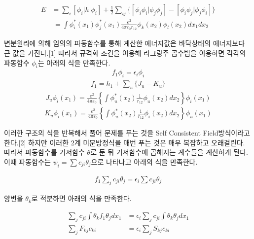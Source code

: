 \documentclass[%
 reprint,
 amsmath,amssymb,
 aps,
]{revtex4-2}
\begin{document}
\begin{align}
	E &= \sum_{i} [\phi_{i}|h|\phi_{i}]+\frac{1}{2}\sum_{ij}\{[\phi_{i}\phi_{i}|\phi_{j}\phi_{j}]-[\phi_{i}\phi_{j}|\phi_{j}\phi_{i}]\}
\end{align}
\begin{align}
	[\phi_{i}\phi_{j}|\phi_{k}\phi_{l}] &= \int \phi_{i}^{*}(x_{1})\phi_{j}^{*}(x_{1})\frac{e^{2}}{4\pi\varepsilon_{0}r_{12}}\phi_{k}(x_{2})\phi_{l}(x_{2})dx_{1}dx_{2}
\end{align}

변분원리에 의해 임의의 파동함수를 통해 계산한 에너지값은 바닥상태의 에너지보다 큰 값을 가진다.[1] 따라서 규격화 조건을 이용해 라그랑주 곱수법을 이용하면 각각의 파동함수 $\phi_{i}$는 아래의 식을 만족한다.
\begin{align}
	f_{1}\phi_{i} = \epsilon_{i}\phi_{i}
\end{align}
\begin{align}
	f_{1} = h_{1} + \sum_{u}\{J_{u}-K_{u}\}
\end{align}
\begin{align}
	J_{u}\phi_{i}(x_{1}) = \frac{e^{2}}{4\pi\varepsilon_{0}}\left\{ \int \phi_{u}^{*}(x_{2})\frac{1}{r_{12}}\phi_{u}(x_{2})dx_{2} \right\}\phi_{i}(x_{1})
\end{align}
\begin{align}
	K_{u}\phi_{i}(x_{1}) = \frac{e^{2}}{4\pi\varepsilon_{0}}\left\{ \int \phi_{u}^{*}(x_{2})\frac{1}{r_{12}}\phi_{i}(x_{2})dx_{2} \right\}\phi_{u}(x_{1})
\end{align}

이러한 구조의 식을 반복해서 풀어 문제를 푸는 것을 Self Consistent Field방식이라고 한다.[2] 하지만 이러한 2계 미분방정식을 매번 푸는 것은 매우 복잡하고 오래걸린다. 따라서 파동함수를 기저함수 $\theta$로 둔 뒤 기저함수에 곱해지는 계수들을 계산하게 된다. 이때 파동함수는 $\psi_{i} = \sum c_{ji}\theta_{j}$으로 나타나고 아래의 식을 만족한다.

\begin{align}
	f_{1}\sum_{j} c_{ji}\theta_{j} = \epsilon_{i}\sum c_{ji}\theta_{j}
\end{align}

양변을 $\theta_{k}$로 적분하면 아래의 식을 만족한다.

\begin{align}
	\sum_{j} c_{ji}\int \theta_{k}f_{1}\theta_{j}dx_{1} &= \epsilon_{i}\sum_{j} c_{ji}\int \theta_{k}\theta_{j}dx_{1}\\
	\sum_{j} F_{kj}c_{ki}&= \epsilon_{i}\sum_{j} S_{kj}c_{ki}
\end{align}
\end{document}
